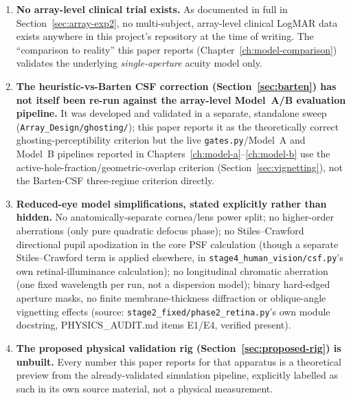 \begin{enumerate}
Model~A (Chapter~\ref{ch:model-a}) is retained and reported in full, per this project's
own policy of not deleting superseded models, but its single-axis sampling convention
(Section~\ref{sec:model-a-limitation}) should not be read as an independent,
full-azimuth confirmation of any result -- only Model~B's numbers carry that property.
\item \textbf{No array-level clinical trial exists.} As documented in full in
Section~\ref{sec:array-exp2}, no multi-subject, array-level clinical LogMAR data exists
anywhere in this project's repository at the time of writing. The ``comparison to
reality'' this paper reports (Chapter~\ref{ch:model-comparison}) validates the
underlying \emph{single-aperture} acuity model only.
\item \textbf{The heuristic-vs-Barten CSF correction (Section~\ref{sec:barten}) has not
itself been re-run against the array-level Model~A/B evaluation pipeline.} It was
developed and validated in a separate, standalone sweep
(\texttt{Array\_Design/ghosting/}); this paper reports it as the theoretically correct
ghosting-perceptibility criterion but the live \texttt{gates.py}/Model~A and Model~B
pipelines reported in Chapters~\ref{ch:model-a}--\ref{ch:model-b} use the
active-hole-fraction/geometric-overlap criterion (Section~\ref{sec:vignetting}), not
the Barten-CSF three-regime criterion directly. 
\item \textbf{Reduced-eye model simplifications, stated explicitly rather than hidden.}
No anatomically-separate cornea/lens power split; no higher-order aberrations (only
pure quadratic defocus phase); no Stiles--Crawford directional pupil apodization in the
core PSF calculation (though a separate Stiles--Crawford term is applied elsewhere, in
\texttt{stage4\_human\_vision/csf.py}'s own retinal-illuminance calculation); no
longitudinal chromatic aberration (one fixed wavelength per run, not a dispersion
model); binary hard-edged aperture masks, no finite membrane-thickness diffraction or
oblique-angle vignetting effects (source:
\texttt{stage2\_fixed/phase2\_retina.py}'s own module docstring, PHYSICS\_AUDIT.md
items E1/E4, verified present).
\label{sec:limitations-optics}
\item \textbf{The proposed physical validation rig (Section~\ref{sec:proposed-rig}) is
unbuilt.} Every number this paper reports for that apparatus is a theoretical preview
from the already-validated simulation pipeline, explicitly labelled as such in its own
source material, not a physical measurement.
\end{enumerate}
